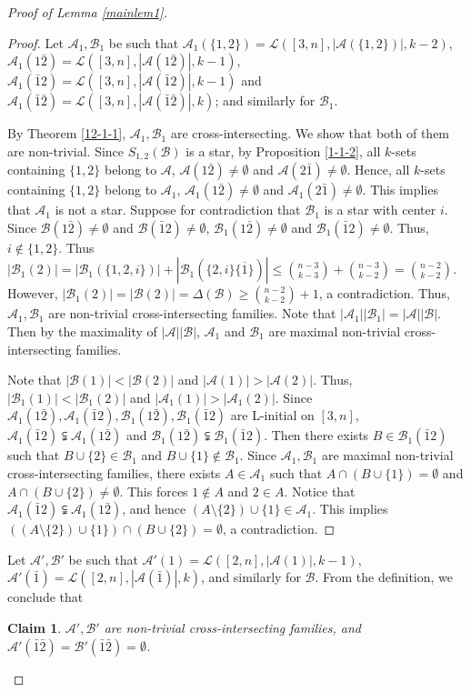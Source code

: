 \documentclass[a4paper,11pt]{article}
\newtheorem{claim}[theorem]{Claim}
\newcommand{\m}{\mathcal}
\begin{document}
\begin{proof}[Proof of Lemma \ref{mainlem1}]
\begin{proof}
Let $\m A_1, \m B_1$ be such that 
$\m A_1(\{1,2\})=\m L([3,n],|\m A(\{1,2\})|,k-2)$, 
$\m A_1(1\bar2)=\m L([3,n],|\m A(1\bar2)|,k-1)$,
$\m A_1(\bar12)=\m L([3,n],|\m A(\bar12)|,k-1)$ and
$\m A_1(\bar1\bar2)=\m L([3,n],|\m A(\bar1\bar2)|,k)$;
and similarly for $\m B_1$. 

By Theorem \ref{12-1-1}, $\m A_1, \m B_1$ are cross-intersecting. We show that both of them are non-trivial. 
Since $S_{1,2}(\m B)$ is a star, by Proposition \ref{1-1-2}, all $k$-sets containing $\{1,2\}$ belong to $\m A$, 
$\mathcal{A}(1\bar{2})\ne \emptyset$ and $\mathcal{A}(2\bar{1})\ne \emptyset$. 
Hence, all $k$-sets containing $\{1,2\}$ belong to $\m A_1$,  
$\mathcal{A}_1(1\bar{2})\ne \emptyset$ and $\mathcal{A}_1(2\bar{1})\ne \emptyset$. 
This implies that $\m A_1$ is not a star.
Suppose for contradiction that $\m B_1$ is a star with center $i$. 
Since $\mathcal{B}(1\bar{2})\ne \emptyset$ and $\mathcal{B}(\bar{1}2)\ne \emptyset$, 
$\mathcal{B}_1(1\bar{2})\ne \emptyset$ and $\mathcal{B}_1(\bar{1}2)\ne \emptyset$. Thus, $i\not\in \{1,2\}$. 
Thus $|\m B_1(2)|=|\m B_1(\{1,2,i\})|+|\m B_1(\{2,i\}\overline{\{1\}})|\le {n-3\choose k-3}+{n-3\choose k-2}={n-2\choose k-2}$. However, $|\m B_1(2)|=|\m B(2)|=\Delta(\m B)\ge {n-2\choose k-2}+1$, a contradiction. Thus, $\m A_1, \m B_1$ are non-trivial cross-intersecting families. 
Note that $|\m A_1||\m B_1|=|\m A||\m B|$. Then by the maximality of $|\m A||\m B|$, $\m A_1$ and $\m B_1$ are maximal non-trivial cross-intersecting families. 

Note that $|\m B(1)|<|\m B(2)|$ and $|\m A(1)|>|\m A(2)|$.
Thus, $|\m B_1(1)|<|\m B_1(2)|$ and $|\m A_1(1)|>|\m A_1(2)|$. 
Since $\m A_1(1\bar2), \m A_1(\bar12), \m B_1(1\bar2), \m B_1(\bar12)$ are L-initial on $[3,n]$, 
$\m A_1(\bar12) \subsetneqq \m A_1(1\bar2)$ and $\m B_1(1\bar2) \subsetneqq \m B_1(\bar12).$
Then there exists $B\in \m B_1(\bar12)$ such that $B\cup \{2\}\in \m B_1$ and $B\cup \{1\}\not\in \m B_1$. 
Since $\m A_1, \m B_1$ are maximal non-trivial cross-intersecting families, there exists $A\in \m A_1$ such that $A\cap (B\cup \{1\})=\emptyset$ and $A\cap (B\cup \{2\})\ne \emptyset$. This forces $1\not\in A$ and $2\in A$. 
Notice that $\m A_1(\bar12) \subsetneqq \m A_1(1\bar2)$, and hence $(A\setminus \{2\})\cup \{1\}\in \m A_1$.
This implies $((A\setminus \{2\})\cup \{1\})\cap(B\cup \{2\})=\emptyset$, a contradiction. 
\end{proof}

Let $\m A', \m B'$ be such that $\mathcal{A}'(1)=\mathcal{L}([2,n], |\mathcal{A}(1)|, k-1)$, $\mathcal{A}'(\bar{1})=\mathcal{L}([2,n], |\mathcal{A}(\bar{1})|, k)$, and similarly for $\mathcal{B}$.
From the definition, we conclude that
\begin{claim}\label{3-29-2}
$\m A', \m B'$ are non-trivial cross-intersecting families, and $\m A'(\bar 1 \bar 2)=\m B'(\bar 1 \bar 2)=\emptyset$.
\end{claim}


\end{proof}
\end{document}

